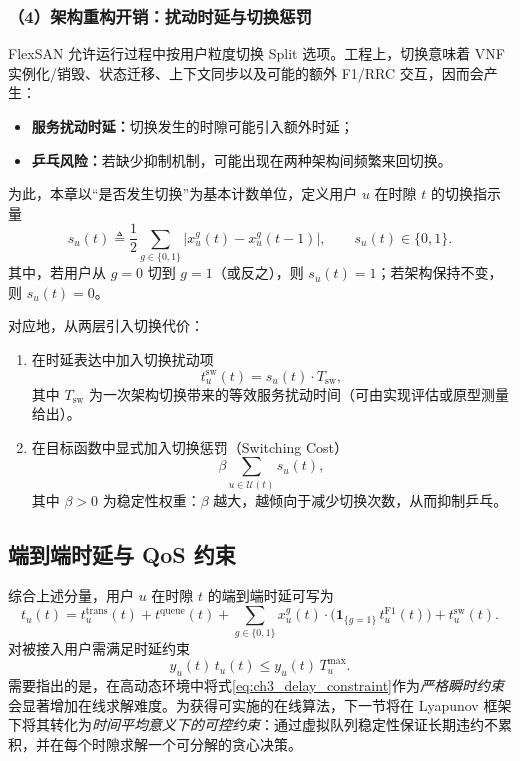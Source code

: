 \documentclass[type=master]{fduthesis}
\begin{document}
\subsubsection*{（4）架构重构开销：扰动时延与切换惩罚}
FlexSAN 允许运行过程中按用户粒度切换 Split 选项。工程上，切换意味着 VNF 实例化/销毁、状态迁移、上下文同步以及可能的额外 F1/RRC 交互，因而会产生：
\begin{itemize}
  \item \textbf{服务扰动时延：}切换发生的时隙可能引入额外时延；
  \item \textbf{乒乓风险：}若缺少抑制机制，可能出现在两种架构间频繁来回切换。
\end{itemize}

为此，本章以“是否发生切换”为基本计数单位，定义用户 $u$ 在时隙 $t$ 的切换指示量
\begin{equation}
s_u(t)\triangleq \frac{1}{2}\sum_{g\in\{0,1\}}\big|x_u^g(t)-x_u^g(t-1)\big|,
\qquad s_u(t)\in\{0,1\}.
\label{eq:ch3_switch_indicator}
\end{equation}
其中，若用户从 $g=0$ 切到 $g=1$（或反之），则 $s_u(t)=1$；若架构保持不变，则 $s_u(t)=0$。

对应地，从两层引入切换代价：
\begin{enumerate}
  \item 在时延表达中加入切换扰动项
  \begin{equation}
  t_{u}^{\mathrm{sw}}(t)= s_u(t)\cdot T_{\mathrm{sw}},
  \label{eq:ch3_switch_delay}
  \end{equation}
  其中 $T_{\mathrm{sw}}$ 为一次架构切换带来的等效服务扰动时间（可由实现评估或原型测量给出）。
  \item 在目标函数中显式加入切换惩罚（Switching Cost）
  \begin{equation}
  \beta \sum_{u\in\mathcal{U}(t)} s_u(t),
  \label{eq:ch3_switch_penalty}
  \end{equation}
  其中 $\beta>0$ 为稳定性权重：$\beta$ 越大，越倾向于减少切换次数，从而抑制乒乓。
\end{enumerate}

\subsection{端到端时延与 QoS 约束}
\label{subsec:ch3_e2e_qos}

综合上述分量，用户 $u$ 在时隙 $t$ 的端到端时延可写为
\begin{equation}
t_u(t)
=
t_{u}^{\mathrm{trans}}(t)
+t^{\mathrm{queue}}(t)
+\sum_{g\in\{0,1\}}x_u^g(t)\cdot \Big(\mathbf{1}_{\{g=1\}}\,t_{u}^{\mathrm{F1}}(t)\Big)
+t_{u}^{\mathrm{sw}}(t).
\label{eq:ch3_e2e}
\end{equation}
对被接入用户需满足时延约束
\begin{equation}
y_u(t)\,t_u(t)\le y_u(t)\,T_u^{\max}.
\label{eq:ch3_delay_constraint}
\end{equation}
需要指出的是，在高动态环境中将式\eqref{eq:ch3_delay_constraint}作为\emph{严格瞬时约束}会显著增加在线求解难度。为获得可实施的在线算法，下一节将在 Lyapunov 框架下将其转化为\emph{时间平均意义下的可控约束}：通过虚拟队列稳定性保证长期违约不累积，并在每个时隙求解一个可分解的贪心决策。
\end{document}
